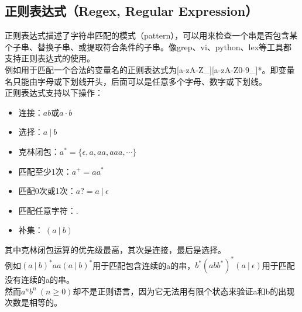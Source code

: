 \vspace{0.5cm}

\subsection{正则表达式（Regex, Regular Expression）}

正则表达式描述了字符串匹配的模式（pattern），可以用来检查一个串是否包含某个子串、替换子串、或提取符合条件的子串。像grep、vi、python、lex等工具都支持正则表达式的使用。\\

例如用于匹配一个合法的变量名的正则表达式为[a-zA-Z\_][a-zA-Z0-9\_]*。即变量名只能由字母或下划线开头，后面可以是任意多个字母、数字或下划线。\\

正则表达式支持以下操作：

\begin{itemize}
	\item 连接：$ ab $或$ a \cdot b $
	\item 选择：$ a\ |\ b $
	\item 克林闭包：$ a^* = \{\epsilon, a, aa, aaa, \cdots\} $
	\item 匹配至少1次：$ a^+ = aa^* $
	\item 匹配0次或1次：$ a? = a\ |\ \epsilon $
	\item 匹配任意字符：$ . $
	\item 补集：$ ~(a\ |\ b) $
\end{itemize}

其中克林闭包运算的优先级最高，其次是连接，最后是选择。\\

例如$ (a\ |\ b)^*aa(a\ |\ b)^* $用于匹配包含连续的a的串，$ b^*(abb^*)^*(a\ |\ \epsilon) $用于匹配没有连续的a的串。\\

然而$ a^nb^n\ (n \ge 0) $却不是正则语言，因为它无法用有限个状态来验证a和b的出现次数是相等的。\\

\newpage